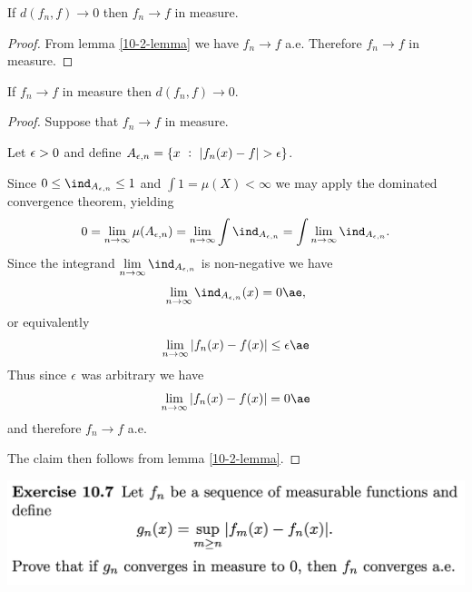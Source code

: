 \begin{claim*}
 If $d(f_n, f) \to 0$ then $f_n \to f$ in measure.
\end{claim*}

\begin{proof}
  From lemma \ref{10-2-lemma} we have $f_n \to f$ a.e. Therefore $f_n \to f$ in measure.
\end{proof}

\begin{claim*}
  If $f_n \to f$ in measure then $d(f_n, f) \to 0$.
\end{claim*}

\begin{proof}
  Suppose that $f_n \to f$ in measure.

  Let $\epsilon > 0$ and define $A_{\epsilon, n} = \{x ~:~ |f_n(x) - f| > \epsilon\}$.

  Since $0 \leq \ind_{A_{\eps, n}} \leq 1$ and $\int 1 = \mu(X) < \infty$ we may apply the dominated
  convergence theorem, yielding
  \begin{align*}
    0 = \limn \mu(A_{\eps, n}) = \limn \int \ind_{A_{\eps, n}} = \int \limn \ind_{A_{\eps, n}}.
  \end{align*}
  Since the integrand $\limn \ind_{A_{\eps, n}}$ is non-negative we have
  \begin{align*}
    \limn \ind_{A_{\eps, n}}(x) = 0 \ae,
  \end{align*}
  or equivalently
  \begin{align*}
    \limn |f_n(x) - f(x)| \leq \eps \ae
  \end{align*}
  Thus since $\epsilon$ was arbitrary we have
  \begin{align*}
    \limn |f_n(x) - f(x)| = 0 \ae
  \end{align*}
  and therefore
  $f_n \to f$ a.e.

  The claim then follows from lemma \ref{10-2-lemma}.
\end{proof}


\newpage
\begin{mdframed}
\includegraphics[width=400pt]{img/analysis--berkeley-202a-hw09-ea17.png}
\end{mdframed}

